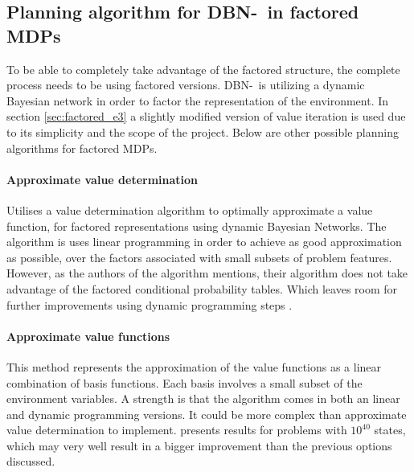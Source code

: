 \subsection{Planning algorithm for DBN-\etre\ in factored MDPs}
\label{sec:better_planing_algos}

To be able to completely take advantage of the factored structure, the complete
process needs to be using factored versions. DBN-\etre\ is utilizing a dynamic
Bayesian network in order to factor the representation of the environment. In
section \ref{sec:factored_e3} a slightly modified version of value iteration is
used due to its simplicity and the scope of the project. Below are other
possible planning algorithms for factored MDPs.

\paragraph{Approximate value determination}

Utilises a value determination algorithm to optimally approximate a value
function, for factored representations using dynamic Bayesian Networks. The
algorithm is uses linear programming in order to achieve as good approximation
as possible, over the factors associated with small subsets of problem
features. However, as the authors of the algorithm mentions, their algorithm
does not take advantage of the factored conditional probability tables. Which
leaves room for further improvements using dynamic programming steps
\parencite{koller1999computing}.

\paragraph{Approximate value functions}

This method represents the approximation of the value functions as a linear
combination of basis functions. Each basis involves a small subset of the
environment variables. A strength is that the algorithm comes in both an linear
and dynamic programming versions. It could be more complex than approximate
value determination to implement. \textcite{guestrin2003efficient} presents
results for problems with $10^{40}$ states, which may very well result in a
bigger improvement than the previous options discussed.
